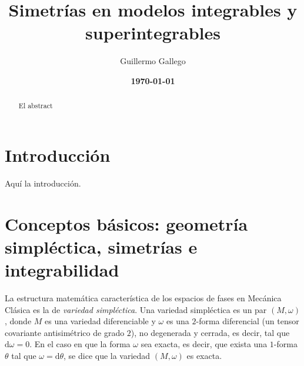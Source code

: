 \documentclass[12pt,a4paper,twoside]{article}
\title{Simetrías en modelos integrables y superintegrables}
\author{Guillermo Gallego}
\date{\bf \today}
\theoremstyle{definition} \newtheorem{defn}[thm]{Definición}
\theoremstyle{definition} \newtheorem{ejemplo}[thm]{Ejemplo}
\theoremstyle{definition} \newtheorem{ejercicio}[thm]{Ejercicio}
\theoremstyle{remark} \newtheorem*{obs}{Observación}
\def\dd{\mathrm{d}}
\begin{document}
\maketitle
\begin{abstract}
  El abstract
\end{abstract}
\newpage

\tableofcontents

\section*{Introducción}
Aquí la introducción.
\section{Conceptos básicos: geometría simpléctica, simetrías e integrabilidad}
La estructura matemática característica de los espacios de fases en Mecánica Clásica es la de \emph{variedad simpléctica}. Una variedad simpléctica es un par $(M,\omega)$, donde $M$ es una variedad diferenciable y $\omega$ es una $2$-forma diferencial (un tensor covariante antisimétrico de grado $2$), no degenerada y cerrada, es decir, tal que $\dd \omega=0$. En el caso en que la forma $\omega$ sea exacta, es decir, que exista una $1$-forma $\theta$ tal que $\omega=\dd \theta$, se dice que la variedad $(M,\omega)$ es exacta. 
\end{document}
